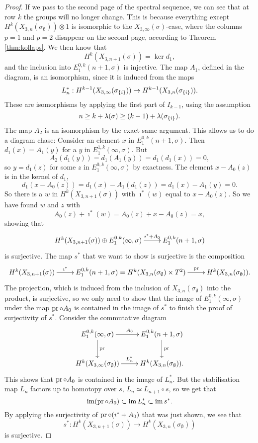 \begin{proof}
  If we pass to the second page of the spectral sequence, we
  can see that at row $k$ the groups will no longer change. This is
  because everything except $H^k(X_{3,n}(\sigma_{\emptyset}))\otimes 1$ is
  isomorphic to the $X_{3,\infty}(\sigma)$-case, where the columns $p=1$
  and $p=2$ disappear on the second page, according to Theorem
  \ref{thm:kollaps}. We then know that
  \[ H^k(X_{3,n+1}(\sigma)) = \ker d_1, \]
  and the inclusion into $E_1^{0,k}(n+1,\sigma)$ is injective.
  The map $A_1$, defined in the diagram, is an isomorphism, since it
  is induced from the maps
  \[ L^*_{n} : H^{k-1}(X_{3,\infty}(\sigma_{\left\{ i \right\}})) \to
  H^{k-1}(X_{3,n}(\sigma_{\left\{ i \right\}})). \]
  These are isomorphisms by applying the first part of $I_{k-1}$,
  using the assumption 
  \[ n \geq k+\lambda(\sigma) \geq
  (k-1)+\lambda(\sigma_{\left\{ i \right\}}). \]
  The map $A_2$ is an isomorphism by the exact same argument.
  This allows us to do a diagram chase: Consider an element $x$ in
  $E_1^{0,k}(n+1,\sigma)$. Then $d_1(x) = A_1(y)$ for a $y$ in
  $E_1^{1,k}(\infty,\sigma)$. But 
  \[ A_2(d_1(y)) = d_1(A_1(y)) = d_1(d_1(x)) = 0, \]
  so $y = d_1(z)$ for some $z$ in $E_1^{0,k}(\infty,\sigma)$ by
  exactness. The element $x - A_0(z)$ is in the kernel of $d_1$,
  \[ d_1(x - A_0(z)) = d_1(x) - A_1(d_1(z)) = d_1(x) - A_1(y) = 0. \]
  So there is a $w$ in $H^k(X_{3,n+1}(\sigma))$ with $\imath^*(w)$
  equal to $x-A_0(z)$. So we have found $w$ and $z$ with
  \[ A_0(z) + \imath^*(w) = A_0(z) + x - A_0(z) = x, \]
  showing that
  \[ \xymatrix{ H^k(X_{3,n+1}(\sigma)) \oplus E_1^{0,k}(\infty,\sigma)
    \ar[r]^-{\imath^* + A_0} & E_1^{0,k}(n+1,\sigma) } \]
  is surjective. The map $s^*$ that we want to show is surjective is
  the composition
  \[ \xymatrix{ H^k(X_{3,n+1}(\sigma)) \ar[r]^-{\imath^*} &
    E_1^{0,k}(n+1,\sigma) = H^k(X_{3,n}(\sigma_{\emptyset})\times T^2)
    \ar[r]^-{\pr} & H^k(X_{3,n}(\sigma_{\emptyset})). } \]
  The projection, which is induced from the inclusion of
  $X_{3,n}(\sigma_{\emptyset})$ into the product, is surjective, so we
  only need to show that the image of
  $E_1^{0,k}(\infty,\sigma)$ under the map $\operatorname{pr}\circ A_0$ is contained
  in the image of $s^*$ to
  finish the proof of surjectivity of $s^*$. Consider the commutative
  diagram
  \[ \xymatrix{ E_1^{0,k}(\infty,\sigma) \ar[r]^{A_0} \ar[d]^{\pr}
    & E_1^{0,k}(n+1,\sigma) \ar[d]^{\pr} \\
    H^k(X_{3,\infty}(\sigma_{\emptyset})) \ar[r]^{L_n^*} &
    H^k(X_{3,n}(\sigma_{\emptyset})). } \]
  This shows that $\operatorname{pr}\circ A_0$ is contained in the image of
  $L_n^*$. But the stabilisation map $L_n$ factors up to homotopy over
  $s$, $L_n \simeq L_{n+1}\circ s$, so we get that
  \[ \operatorname{im}(\operatorname{pr}\circ A_0) \subset \operatorname{im} L_n^* \subset \operatorname{im} s^*. \]
  By applying the surjectivity of $\operatorname{pr}\circ (\imath^*+A_0)$ that was
  just shown, we see that
  \[  s^* : H^k(X_{3,n+1}(\sigma)) \to
  H^k(X_{3,n}(\sigma_{\emptyset})) \] 
  is surjective.
  

\end{proof}
